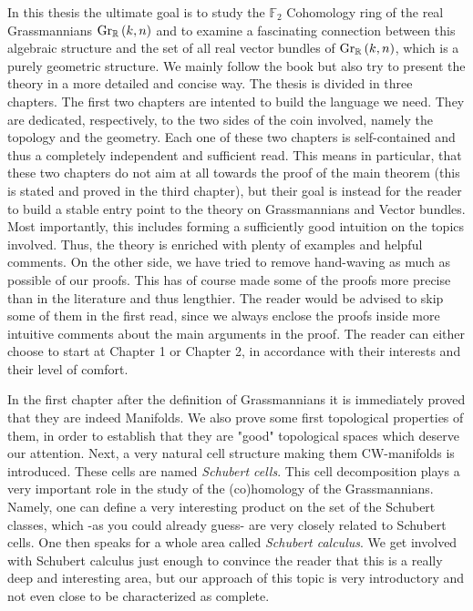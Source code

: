 In this thesis the  ultimate goal is to study the $\mathbb{F}_2$ Cohomology ring of the real Grassmannians $\Gr{k}{n}{\mathbb{R}}$ and to examine a fascinating connection between this algebraic structure and the set of all real vector bundles of $\Gr{k}{n}{\mathbb{R}}$, which is a purely geometric structure. We mainly follow the book \cite{char_class} but also try to present the theory in a more detailed and concise way. The thesis is divided in three chapters.
The first two chapters are intented to build the language we need. They are dedicated, respectively, to the two sides of the coin involved, namely the topology and the geometry. Each one of these two chapters is self-contained and thus a completely independent and sufficient read. This means in particular, that these two chapters do not aim at all towards the proof of the main theorem (this is stated and proved in the third chapter), but their goal is instead for the reader to build a stable entry point to the theory on Grassmannians and Vector bundles. Most importantly, this includes forming a sufficiently good intuition on the topics involved. Thus, the theory is enriched with plenty of examples and helpful comments. On the other side, we have tried to remove hand-waving as much as possible of our proofs. This has of course made some of the proofs more precise than in the literature and thus lengthier. The reader would be advised to skip some of them in the first read, since we always enclose the proofs inside more intuitive comments about the main arguments in the proof.
The reader can either choose to start at Chapter 1 or Chapter 2, in accordance with their interests and their level of comfort.

In the first chapter after the definition of Grassmannians it is immediately proved that they are indeed Manifolds. We also prove some first topological properties of them, in order to establish that they are "good" topological spaces which deserve our attention. Next, a very natural cell structure making them CW-manifolds is introduced. These cells are named \emph{Schubert cells}. This cell decomposition plays a very important role in the study of the (co)homology of the Grassmannians. Namely, one can define a very interesting product on the set of the Schubert classes, which -as you could already guess- are very closely related to Schubert cells. One then speaks for a whole area called \emph{Schubert calculus}. We get involved with Schubert calculus just enough to convince the reader that this is a really deep and interesting area, but our approach of this topic is very introductory and not even close to be characterized as complete.

